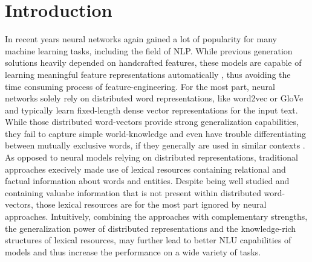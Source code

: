 \section{Introduction}
In recent years neural networks again gained a lot of popularity for many machine learning tasks, including the field of \ac{NLP}. While previous generation solutions heavily depended on handcrafted features, these models are capable of learning meaningful feature representations automatically \citep{bengio2013representation}, thus avoiding the time consuming process of feature-engineering. For the most part, neural networks solely rely on distributed word representations, like word2vec \citep{mikolov2013distributed} or GloVe \citep{pennington2014glove} and typically learn fixed-length dense vector representations for the input text. While those distributed word-vectors provide strong generalization capabilities, they fail to capture simple world-knowledge \citep{celikyilmaz2010enriching} and even have trouble differentiating between mutually exclusive words, if they generally are used in similar contexts \citep{vulic2017morph}. As opposed to neural models relying on distributed representations, traditional approaches execively made use of lexical resources containing relational and factual information about words and entities. Despite being well studied and containing valuabe information that is not present within distributed word-vectors, those lexical resources are for the most part ignored by neural approaches. Intuitively, combining the approaches with complementary strengths, the generalization power of distributed representations and the knowledge-rich structures of lexical resources, may further lead to better \ac{NLU} capabilities of models and thus increase the performance on a wide variety of tasks.

